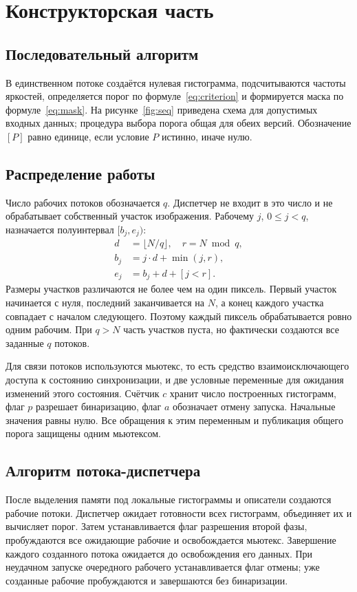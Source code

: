 \clearpage\section{Конструкторская часть}
\subsection{Последовательный алгоритм}
В единственном потоке создаётся нулевая гистограмма, подсчитываются частоты яркостей, определяется порог по формуле~\eqref{eq:criterion} и формируется маска по формуле~\eqref{eq:mask}. На рисунке~\ref{fig:seq} приведена схема для допустимых входных данных; процедура выбора порога общая для обеих версий. Обозначение $[P]$ равно единице, если условие $P$ истинно, иначе нулю.

\clearpage\subsection{Распределение работы}
Число рабочих потоков обозначается $q$. Диспетчер не входит в это число и не обрабатывает собственный участок изображения. Рабочему $j$, $0\le j<q$, назначается полуинтервал $[b_j,e_j)$:
\begin{equation}\label{eq:partition}
\begin{aligned}
d&=\lfloor N/q\rfloor,\quad r=N\bmod q,\\
b_j&=j\cdot d+\min(j,r),\\
e_j&=b_j+d+[j<r].
\end{aligned}
\end{equation}
Размеры участков различаются не более чем на один пиксель. Первый участок начинается с нуля, последний заканчивается на $N$, а конец каждого участка совпадает с началом следующего. Поэтому каждый пиксель обрабатывается ровно одним рабочим. При $q>N$ часть участков пуста, но фактически создаются все заданные $q$ потоков.

Для связи потоков используются мьютекс, то есть средство взаимоисключающего доступа к состоянию синхронизации, и две условные переменные для ожидания изменений этого состояния. Счётчик $c$ хранит число построенных гистограмм, флаг $p$ разрешает бинаризацию, флаг $a$ обозначает отмену запуска. Начальные значения равны нулю. Все обращения к этим переменным и публикация общего порога защищены одним мьютексом.

\subsection{Алгоритм потока-диспетчера}
После выделения памяти под локальные гистограммы и описатели создаются рабочие потоки. Диспетчер ожидает готовности всех гистограмм, объединяет их и вычисляет порог. Затем устанавливается флаг разрешения второй фазы, пробуждаются все ожидающие рабочие и освобождается мьютекс. Завершение каждого созданного потока ожидается до освобождения его данных. При неудачном запуске очередного рабочего устанавливается флаг отмены; уже созданные рабочие пробуждаются и завершаются без бинаризации.

